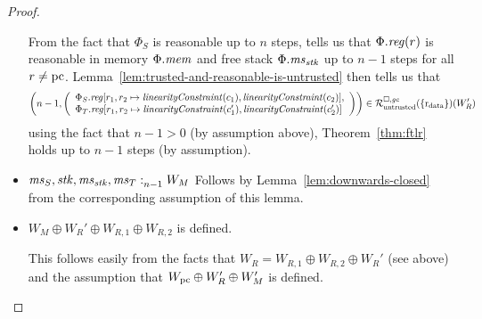 \begin{proof}
\begin{itemize}
    From the fact that $\Phi_S$ is reasonable up to $n$ steps, tells us that $\Phi.\reg(r)$ is reasonable in memory $\Phi.\mem$ and free stack $\Phi.\ms_\stk$ up to $n-1$ steps for all $r \neq \pcreg$.
    Lemma~\ref{lem:trusted-and-reasonable-is-untrusted} then tells us that
    \begin{equation*}
      \npair[n-1]{\left(\array{l}\Phi_S.\reg\update{r_1,r_2}{\linCons{c_1},\linCons{c_2}},\\ \Phi_T.\reg\update{r_1,r_2}{\linCons{c_1'},\linCons{c_2'}}\endarray\right)} \in
      \lrr(\{\rdata\})(W_R')
    \end{equation*}
    using the fact that $n-1 > 0$ (by assumption above), Theorem~\ref{thm:ftlr} holds up to $n-1$ steps (by assumption).

  \item $\memSat[n-1]{\ms_S,\stk,\ms_\stk,\ms_T}{W_M}$
    Follows by Lemma~\ref{lem:downwards-closed} from the corresponding assumption of this lemma.

  \item $W_M \oplus W_R' \oplus W_{R,1} \oplus W_{R,2}$ is defined.

    This follows easily from the facts that $W_R = W_{R,1} \oplus W_{R,2} \oplus W_R'$ (see above) and the assumption that $W_\pcreg \oplus W_R' \oplus W_M'$ is defined.
  \end{itemize}
\end{proof}

